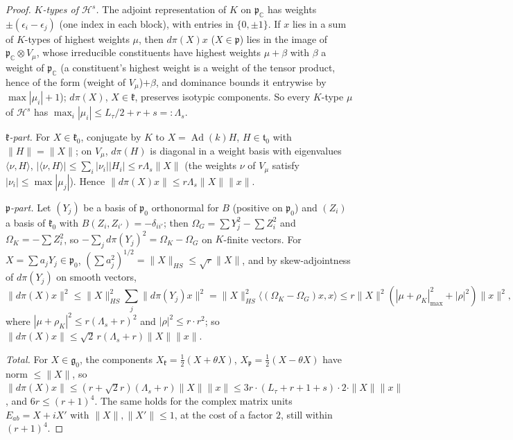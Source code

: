 \documentclass[10pt]{amsart}
\theoremstyle{definition}
\theoremstyle{remark}
\newcommand{\C}{\mathbb C}
\begin{document}
\begin{proof}
\emph{$K$-types of $\mathcal H^s$.} The adjoint representation of $K$ on $\mathfrak p_\C$ has weights $\pm(\epsilon_i-
\epsilon_j)$ (one index in each block), with entries in $\{0,\pm1\}$. If $x$ lies in a sum of $K$-types of highest
weights $\mu$, then $d\pi(X)x$ ($X\in\mathfrak p$) lies in the image of $\mathfrak p_\C\otimes V_\mu$, whose
irreducible constituents have highest weights $\mu+\beta$ with $\beta$ a weight of $\mathfrak p_\C$ (a constituent's
highest weight is a weight of the tensor product, hence of the form (weight of $V_\mu$)$+\beta$, and dominance
bounds it entrywise by $\max|\mu_i|+1$); $d\pi(X)$, $X\in\mathfrak k$, preserves isotypic components. So every
$K$-type $\mu$ of $\mathcal H^s$ has $\max_i|\mu_i|\le L_\tau/2+r+s=:\Lambda_s$.

\emph{$\mathfrak k$-part.} For $X\in\mathfrak k_0$, conjugate by $K$ to $X=\operatorname{Ad}(k)H$, $H\in\mathfrak t_0$ with
$\|H\|=\|X\|$; on $V_\mu$, $d\pi(H)$ is diagonal in a weight basis with eigenvalues $\langle\nu,H\rangle$, $|\langle\nu,
H\rangle|\le\sum_i|\nu_i||H_i|\le r\Lambda_s\|X\|$ (the weights $\nu$ of $V_\mu$ satisfy $|\nu_i|\le\max|\mu_j|$). Hence $\|d\pi(X)
x\|\le r\Lambda_s\|X\|\|x\|$.

\emph{$\mathfrak p$-part.} Let $(Y_j)$ be a basis of $\mathfrak p_0$ orthonormal for $B$ (positive on $\mathfrak p_0$) and
$(Z_i)$ a basis of $\mathfrak k_0$ with $B(Z_i,Z_{i'})=-\delta_{ii'}$; then $\Omega_G=\sum Y_j^2-\sum Z_i^2$ and $\Omega_K=-\sum Z_i^2$, so
$-\sum_jd\pi(Y_j)^2=\Omega_K-\Omega_G$ on $K$-finite vectors. For $X=\sum a_jY_j\in\mathfrak p_0$, $(\sum a_j^2)^{1/2}=\|X\|_{HS}\le
\sqrt r\|X\|$, and by skew-adjointness of $d\pi(Y_j)$ on smooth vectors,
\[
\|d\pi(X)x\|^2\le\|X\|_{HS}^2\sum_j\|d\pi(Y_j)x\|^2=\|X\|_{HS}^2\langle(\Omega_K-\Omega_G)x,x\rangle\le r\|X\|^2(|\mu+\rho_K|^2_{\max}+|\rho|^2)\|x\|^2,
\]
where $|\mu+\rho_K|^2\le r(\Lambda_s+r)^2$ and $|\rho|^2\le r\cdot r^2$; so $\|d\pi(X)x\|\le\sqrt2\,r(\Lambda_s+r)\|X\|\|x\|$.

\emph{Total.} For $X\in\mathfrak g_0$, the components $X_{\mathfrak k}=\frac12(X+\theta X)$, $X_{\mathfrak p}=\frac12(X-\theta X)$ have norm $\le\|X\|$, so
$\|d\pi(X)x\|\le(r+\sqrt2r)(\Lambda_s+r)\|X\|\|x\|\le3r\cdot(L_\tau+r+1+s)\cdot2\cdot\|X\|\|x\|$, and $6r\le(r+1)^4$. The same
holds for the complex matrix units $E_{ab}=X+iX'$ with $\|X\|,\|X'\|\le1$, at the cost of a factor $2$, still within
$(r+1)^4$.
\end{proof}
\end{document}
